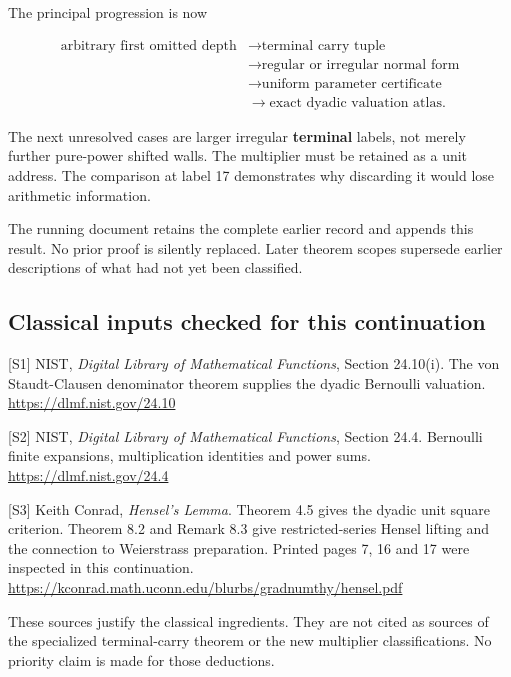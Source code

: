 \documentclass[11pt,letterpaper]{article}
\begin{document}
The principal progression is now

\[
\begin{aligned}
\text{arbitrary first omitted depth}
&\longrightarrow\text{terminal carry tuple}\\
&\longrightarrow\text{regular or irregular normal form}\\
&\longrightarrow\text{uniform parameter certificate}\\
&\longrightarrow\text{exact dyadic valuation atlas}.
\end{aligned}
\]

The next unresolved cases are larger irregular \textbf{terminal} labels, not merely further pure-power shifted walls. The multiplier must be retained as a unit address. The comparison at label 17 demonstrates why discarding it would lose arithmetic information.

The running document retains the complete earlier record and appends this result. No prior proof is silently replaced. Later theorem scopes supersede earlier descriptions of what had not yet been classified.

\clearpage

\subsection{Classical inputs checked for this continuation}\label{classical-inputs-checked-for-this-continuation}

{[}S1{]} NIST, \emph{Digital Library of Mathematical Functions}, Section 24.10(i). The von Staudt-Clausen denominator theorem supplies the dyadic Bernoulli valuation. \url{https://dlmf.nist.gov/24.10}

{[}S2{]} NIST, \emph{Digital Library of Mathematical Functions}, Section 24.4. Bernoulli finite expansions, multiplication identities and power sums. \url{https://dlmf.nist.gov/24.4}

{[}S3{]} Keith Conrad, \emph{Hensel's Lemma}. Theorem 4.5 gives the dyadic unit square criterion. Theorem 8.2 and Remark 8.3 give restricted-series Hensel lifting and the connection to Weierstrass preparation. Printed pages 7, 16 and 17 were inspected in this continuation. \url{https://kconrad.math.uconn.edu/blurbs/gradnumthy/hensel.pdf}

These sources justify the classical ingredients. They are not cited as sources of the specialized terminal-carry theorem or the new multiplier classifications. No priority claim is made for those deductions.
\end{document}
